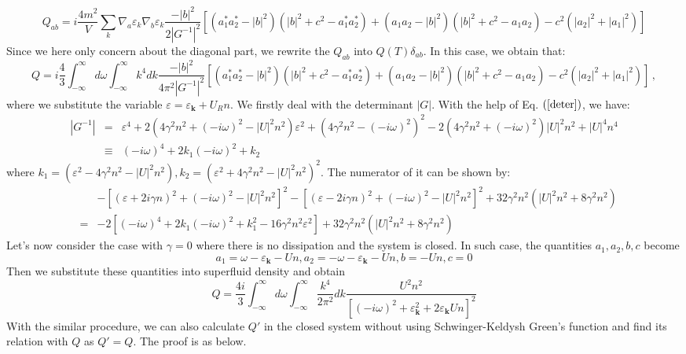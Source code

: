 \documentclass[aps,onecolumn,superscriptaddress,notitlepage,longbibliography]{revtex4-1}
\begin{document}
\begin{equation}
  Q_{a b} = i\frac{4 m^2}{ V} \sum_k \nabla_a \varepsilon_k \nabla_b
  \varepsilon_k \frac{- | b |^2}{2 | G^{- 1} |^2} \left[ (a_1^{\ast}
  a_2^{\ast} - | b |^2) (| b |^2 + c^2 - a_1^{\ast} a_2^{\ast}) + \left( a_1
  a_2 - | b |^2 \right) (| b |^2 + c^2 - a_1 a_2) - c^2 (| a_2 |^2 + | a_1
  |^2) \right]
\end{equation}
Since we here only concern about the diagonal part, we rewrite the $Q_{a b}$
into $Q (T) \delta_{a b}$. In this case, we obtain that:
\begin{equation}
  Q = i\frac{4}{3} \int_{-\infty}^{\infty}d\omega \int_{- \infty}^{\infty} k^4 d k \frac{- | b
  |^2}{4 \pi^2 | G^{- 1} |^2} \left[ (a_1^{\ast} a_2^{\ast} - | b |^2) (| b
  |^2 + c^2 - a_1^{\ast} a_2^{\ast}) + \left( a_1 a_2 - | b |^2 \right) (| b
  |^2 + c^2 - a_1 a_2) - c^2 (| a_2 |^2 + | a_1 |^2) \right] \,,
  \label{Qboson}
\end{equation}
where we substitute the variable $\varepsilon = \varepsilon_{\mathbf{k}} +
U_R n$. We firstly deal with the determinant $| G |$. With the help of Eq.
$\left(  \ref{deter} \right)$, we have:
\begin{eqnarray}
  | G^{- 1} | & = & \varepsilon^4 + 2 (4 \gamma^2 n^2 + (-i\omega)^2 - | U |^2
  n^2) \varepsilon^2 + (4 \gamma^2 n^2 - (-i\omega)^2)^2 - 2 (4 \gamma^2 n^2 +
  (-i\omega)^2) | U |^2 n^2 + | U |^4 n^4 \nonumber\\
  & \equiv & (-i\omega)^4 + 2 k_1 (-i\omega)^2 + k_2 
\end{eqnarray}
where $k_1 = (\varepsilon^2 - 4 \gamma^2 n^2 - | U |^2 n^2), k_2 =
(\varepsilon^2 + 4 \gamma^2 n^2 - | U |^2 n^2)^2$. The numerator of it can be
shown by:
\begin{eqnarray}
  &  & - [(\varepsilon + 2 i \gamma n)^2 + (-i\omega)^2 - | U |^2 n^2]^2 -
  [(\varepsilon - 2 i \gamma n)^2 + (-i\omega)^2 - | U |^2 n^2]^2 + 32 \gamma^2
  n^2 (| U |^2 n^2 + 8 \gamma^2 n^2) \nonumber\\
  & = & - 2 [(-i\omega)^4 + 2 k_1 (-i\omega)^2 + k_1^2 - 16 \gamma^2 n^2
  \varepsilon^2] + 32 \gamma^2 n^2 (| U |^2 n^2 + 8 \gamma^2 n^2) 
\end{eqnarray}
Let's now consider the case with $\gamma = 0$ where there is no dissipation
and the system is closed. In such case, the quantities $a_1, a_2, b, c$ become
\begin{equation}
  a_1 = \omega - \varepsilon_{\mathbf{k}} - U n, a_2 = - \omega -
  \varepsilon_{\mathbf{k}} - U n, b = - U n, c = 0
\end{equation}
Then we substitute these quantities into superfluid density and obtain
\begin{equation}
  Q = \frac{4i}{3} \int_{-\infty}^{\infty}d\omega \int_{- \infty}^{\infty} \frac{k^4}{2 \pi^2} d
  k \frac{U^2 n^2}{[(-i\omega)^2 + \varepsilon_{\mathbf{k}}^2 + 2
  \varepsilon_{\mathbf{k}} U n]^2} \label{Qzero}
\end{equation}
With the similar procedure, we can also calculate $Q'$ in the closed system
without using Schwinger-Keldysh Green's function and find its relation with
$Q$ as $Q' = Q$. The proof is as below.
\end{document}
